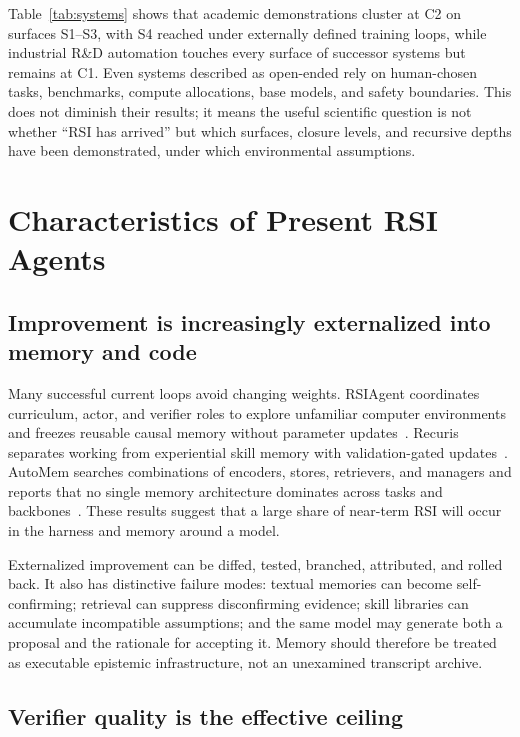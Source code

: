 \documentclass[11pt,a4paper]{article}
\begin{document}
Table~\ref{tab:systems} shows that academic demonstrations cluster at C2 on surfaces S1--S3, with S4 reached under externally defined training loops, while industrial R\&D automation touches every surface of successor systems but remains at C1. Even systems described as open-ended rely on human-chosen tasks, benchmarks, compute allocations, base models, and safety boundaries. This does not diminish their results; it means the useful scientific question is not whether ``RSI has arrived'' but which surfaces, closure levels, and recursive depths have been demonstrated, under which environmental assumptions.

\section{Characteristics of Present RSI Agents}

\subsection{Improvement is increasingly externalized into memory and code}

Many successful current loops avoid changing weights. RSIAgent coordinates curriculum, actor, and verifier roles to explore unfamiliar computer environments and freezes reusable causal memory without parameter updates~\cite{rsiagent}. Recuris separates working from experiential skill memory with validation-gated updates~\cite{recuris}. AutoMem searches combinations of encoders, stores, retrievers, and managers and reports that no single memory architecture dominates across tasks and backbones~\cite{automem}. These results suggest that a large share of near-term RSI will occur in the harness and memory around a model.

Externalized improvement can be diffed, tested, branched, attributed, and rolled back. It also has distinctive failure modes: textual memories can become self-confirming; retrieval can suppress disconfirming evidence; skill libraries can accumulate incompatible assumptions; and the same model may generate both a proposal and the rationale for accepting it. Memory should therefore be treated as executable epistemic infrastructure, not an unexamined transcript archive.

\subsection{Verifier quality is the effective ceiling}
\end{document}
